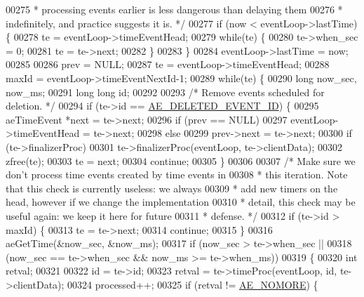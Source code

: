 \begin{DoxyCode}
00275 \textcolor{comment}{     * processing events earlier is less dangerous than delaying them}
00276 \textcolor{comment}{     * indefinitely, and practice suggests it is. */}
00277     \textcolor{keywordflow}{if} (now < eventLoop->lastTime) \{
00278         te = eventLoop->timeEventHead;
00279         \textcolor{keywordflow}{while}(te) \{
00280             te->when\_sec = 0;
00281             te = te->next;
00282         \}
00283     \}
00284     eventLoop->lastTime = now;
00285 
00286     prev = NULL;
00287     te = eventLoop->timeEventHead;
00288     maxId = eventLoop->timeEventNextId-1;
00289     \textcolor{keywordflow}{while}(te) \{
00290         \textcolor{keywordtype}{long} now\_sec, now\_ms;
00291         \textcolor{keywordtype}{long} \textcolor{keywordtype}{long} id;
00292 
00293         \textcolor{comment}{/* Remove events scheduled for deletion. */}
00294         \textcolor{keywordflow}{if} (te->id == \hyperlink{ae_8h_aee0b2fc7b62d8e06517136a91d7f635d}{AE\_DELETED\_EVENT\_ID}) \{
00295             aeTimeEvent *next = te->next;
00296             \textcolor{keywordflow}{if} (prev == NULL)
00297                 eventLoop->timeEventHead = te->next;
00298             \textcolor{keywordflow}{else}
00299                 prev->next = te->next;
00300             \textcolor{keywordflow}{if} (te->finalizerProc)
00301                 te->finalizerProc(eventLoop, te->clientData);
00302             zfree(te);
00303             te = next;
00304             \textcolor{keywordflow}{continue};
00305         \}
00306 
00307         \textcolor{comment}{/* Make sure we don't process time events created by time events in}
00308 \textcolor{comment}{         * this iteration. Note that this check is currently useless: we always}
00309 \textcolor{comment}{         * add new timers on the head, however if we change the implementation}
00310 \textcolor{comment}{         * detail, this check may be useful again: we keep it here for future}
00311 \textcolor{comment}{         * defense. */}
00312         \textcolor{keywordflow}{if} (te->id > maxId) \{
00313             te = te->next;
00314             \textcolor{keywordflow}{continue};
00315         \}
00316         aeGetTime(&now\_sec, &now\_ms);
00317         \textcolor{keywordflow}{if} (now\_sec > te->when\_sec ||
00318             (now\_sec == te->when\_sec && now\_ms >= te->when\_ms))
00319         \{
00320             \textcolor{keywordtype}{int} retval;
00321 
00322             id = te->id;
00323             retval = te->timeProc(eventLoop, id, te->clientData);
00324             processed++;
00325             \textcolor{keywordflow}{if} (retval != \hyperlink{ae_8h_a51464410d1f951b043b6d881574e4a4a}{AE\_NOMORE}) \{

\end{DoxyCode}
